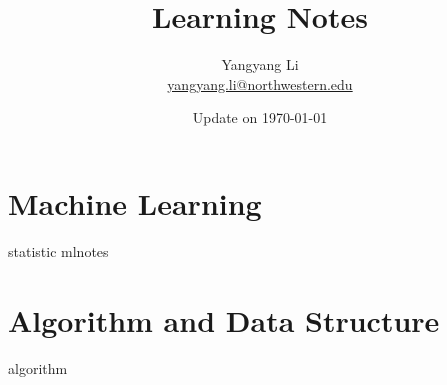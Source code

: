 \documentclass{scinote}
\begin{document}
\title{\bf \huge Learning Notes}
\author{Yangyang Li \\ \href{mailto:yangyang.li@northwestern.edu}{yangyang.li@northwestern.edu}}

\date{Update on \today}
\maketitle
\setcounter{tocdepth}{2}
\setcounter{minitocdepth}{1}

\begin{multicols}{2}
	\dominitoc%
	\adjustmtc[2]%
	\tableofcontents
	\label{toc-contents}
\end{multicols}

\listoffigures
\begin{multicols}{2}
	\listoftheorems[ignoreall,show={theorem}]
\end{multicols}

\renewcommand{\listtheoremname}{List of Definitions}
\begin{multicols}{2}
	\listoftheorems[ignoreall,show={definition}]
\end{multicols}

\printglossaries


\mainmatter %


\part{Machine Learning}
{statistic}
{mlnotes}

\part{Algorithm and Data Structure}
{algorithm}
\end{document}
